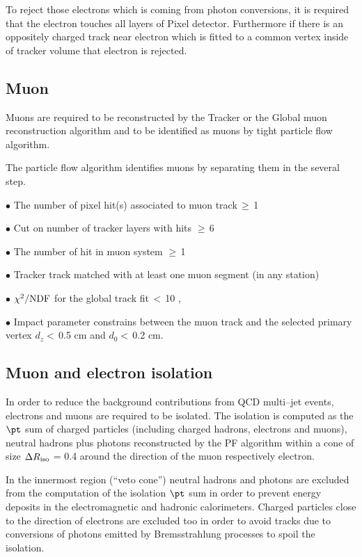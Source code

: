 To reject those electrons which is coming from photon conversions, it is required that the electron touches all layers of Pixel detector. Furthermore if there is an oppositely charged track near electron which is fitted to a common vertex inside of tracker volume that electron is rejected. 
\subsection{Muon}
Muons are required to be reconstructed by the Tracker or the Global muon reconstruction algorithm and to be identified as 
muons by tight particle flow algorithm.

The particle flow algorithm identifies  muons by separating them in the several step.


$\bullet$ The number of pixel hit(s) associated to muon track\,$\geq $\,1

$\bullet$ Cut on number of tracker layers with hits $\geq $\,6

$\bullet$ The number of hit in muon system $\geq $\,1

$\bullet$ Tracker track matched with at least one muon segment (in any station)

$\bullet$ $\chi ^{2}/{\rm NDF} $ for the global track fit\,$< $\,10 ,

$\bullet$ Impact parameter constrains between the muon track and the selected primary vertex 
 $d_{z} < $\,0.5 cm and $d_{0} <$\,0.2 cm.

\subsection{Muon and electron isolation}

In order to reduce the background contributions from QCD multi–jet events, electrons and
muons are required to be isolated. The isolation is computed as the $\pt$ sum of charged particles (including charged hadrons, 
electrons and muons), neutral hadrons plus photons reconstructed by the PF algorithm within a cone of size
$\Delta R_{\rm iso}$ = 0.4 around the direction of the muon respectively electron. 

In the innermost region
(``veto cone'') neutral
hadrons and photons  are excluded from the computation of the isolation $\pt$ sum in order to prevent energy deposits in the electromagnetic and hadronic calorimeters. Charged particles close to the direction of electrons  are excluded too in order to avoid tracks due to conversions of photons emitted by Bremsstrahlung processes to spoil the isolation.

